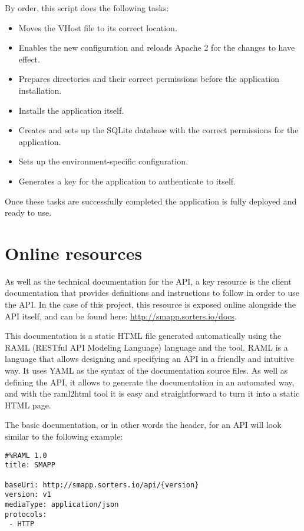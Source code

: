 By order, this script does the following tasks:

\begin{itemize}
\item Moves the VHost file to its correct location.
\item Enables the new configuration and reloads Apache 2 for the changes to have effect.
\item Prepares directories and their correct permissions before the application installation.
\item Installs the application itself.
\item Creates and sets up the SQLite database with the correct permissions for the application.
\item Sets up the environment-specific configuration.
\item Generates a key for the application to authenticate to itself.
\end{itemize}

Once these tasks are successfully completed the application is fully deployed and ready to use.

\section{Online resources}
As well as the technical documentation for the API, a key resource is the client documentation that provides definitions and instructions to follow in order to use the API. In the case of this project, this resource is exposed online alongside the API itself, and can be found here: \href{http://smapp.sorters.io/docs}{http://smapp.sorters.io/docs}.

This documentation is a static HTML file generated automatically using the RAML (RESTful API Modeling Language) language and the  tool. RAML is a language that allows designing and specifying an API in a friendly and intuitive way. It uses YAML as the syntax of the documentation source files. As well as defining the API, it allows to generate the documentation in an automated way, and with the raml2html tool it is easy and straightforward to turn it into a static HTML page.

The basic documentation, or in other words the header, for an API will look similar to the following example:

\begin{verbatim}
#%RAML 1.0
title: SMAPP

baseUri: http://smapp.sorters.io/api/{version}
version: v1
mediaType: application/json
protocols:
 - HTTP
\end{verbatim}

